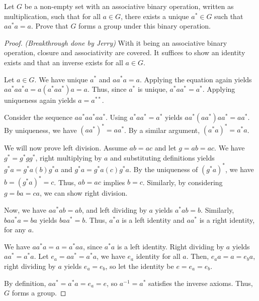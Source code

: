 \documentclass[11pt]{article}
\begin{document}
\newpage
\begin{question}
    Let $G$ be a non-empty set with an associative binary operation,
    written as multiplication, such that 
    for all $a \in G$, there exists a unique $a^{*} \in G$ such that $aa^{*}a = a$.
    Prove that $G$ forms a group under this binary operation.
\end{question}
\begin{proof}
    \textit{(Breakthrough done by Jerry)}
    With it being an associative binary operation, 
    closure and associativity are covered.
    It suffices to show an identity exists and that
    an inverse exists for all $a \in G$.

    Let $a \in G$.
    We have unique $a^{*}$ and $aa^{*}a = a$.
    Applying the equation again yields $aa^{*}aa^{*}a = a(a^{*}aa^{*})a = a$.
    Thus, since $a^{*}$ is unique, $a^{*}aa^{*} = a^{*}$.
    Applying uniqueness again yields $a = a^{**}$.


    Consider the sequence $aa^{*}aa^{*}aa^{*}$.
    Using $a^{*}aa^{*} = a^{*}$ yields $aa^{*}(aa^{*})aa^{*} = aa^{*}$.
    By uniqueness, we have $(aa^{*})^{*} = aa^{*}$.
    By a similar argument, $(a^{*}a)^{*} = a^{*}a$.

    We will now prove left division.
    Assume $ab = ac$ and let $g = ab = ac$.
    We have $g^{*} = g^{*}gg^{*}$,
    right multiplying by $a$
    and substituting definitions yields
    $g^{*}a = g^{*}a(b)g^{*}a$ and $g^{*}a = g^{*}a(c)g^{*}a$.
    By the uniqueness of $(g^{*}a)^{*}$, we have $b = (g^{*}a)^{*} = c$.
    Thus, $ab = ac$ implies $b = c$.
    Similarly, by considering $g = ba = ca$, we can show right division.
    
    Now, we have $aa^{*}ab = ab$, and left dividing by $a$ yields $a^{*}ab = b$.
    Similarly, $baa^{*}a = ba$ yields $baa^{*} = b$.
    Thus, $a^{*}a$ is a left identity and $aa^{*}$ is a right identity,
    for any $a$.

    We have $aa^{*}a = a = a^{*}aa$, since $a^{*}a$ is a left identity.
    Right dividing by $a$ yields $aa^{*} = a^{*}a$. Let $e_a = aa^{*} = a^{*}a$,
    we have $e_a$ identity for all $a$.
    Then, $e_a a = a = e_b a$, right dividing by $a$ yields $e_a = e_b$, so let
    the identity be $e = e_a = e_b$.

    By definition, $aa^{*} = a^{*}a = e_a = e$, 
    so $a^{-1} = a^{*}$ satisfies the inverse axioms.
    Thus, $G$ forms a group.
\end{proof}
\end{document}
